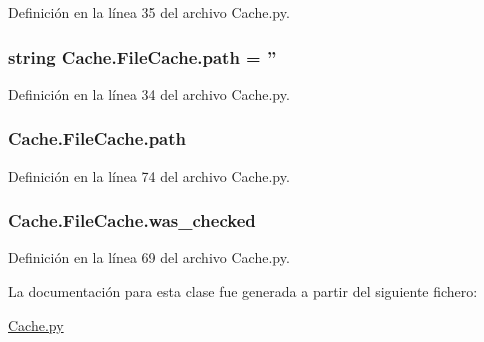 Definición en la línea 35 del archivo Cache.\-py.

\hypertarget{class_cache_1_1_file_cache_aa3e48c8aceb54811558590d05769af11}{
\subsubsection[{path}]{\setlength{\rightskip}{0pt plus 5cm}string Cache.\-File\-Cache.\-path = ''\hspace{0.3cm}{\ttfamily [static]}}}\label{class_cache_1_1_file_cache_aa3e48c8aceb54811558590d05769af11}


Definición en la línea 34 del archivo Cache.\-py.

\hypertarget{class_cache_1_1_file_cache_a969a9af6b255a6d9b14d71ee429cf6af}{
\subsubsection[{path}]{\setlength{\rightskip}{0pt plus 5cm}Cache.\-File\-Cache.\-path}}\label{class_cache_1_1_file_cache_a969a9af6b255a6d9b14d71ee429cf6af}


Definición en la línea 74 del archivo Cache.\-py.

\hypertarget{class_cache_1_1_file_cache_ac795fe342f956e8b8cd2ec23267c674d}{
\subsubsection[{was\-\_\-checked}]{\setlength{\rightskip}{0pt plus 5cm}Cache.\-File\-Cache.\-was\-\_\-checked}}\label{class_cache_1_1_file_cache_ac795fe342f956e8b8cd2ec23267c674d}


Definición en la línea 69 del archivo Cache.\-py.



La documentación para esta clase fue generada a partir del siguiente fichero\-:\begin{DoxyCompactItemize}
\item 
\hyperlink{_cache_8py}{Cache.\-py}\end{DoxyCompactItemize}
